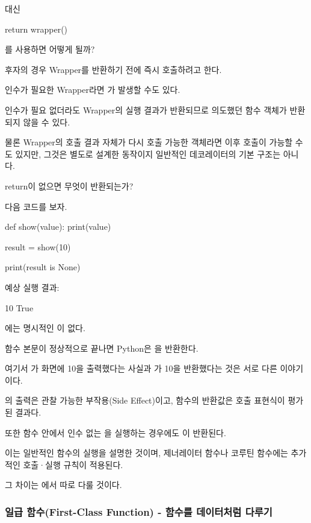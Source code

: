 대신

\begin{dhkcode}
return wrapper()
\end{dhkcode}

를 사용하면 어떻게 될까?

후자의 경우 Wrapper를 반환하기 전에 즉시 호출하려고 한다.

인수가 필요한 Wrapper라면 가 발생할 수도 있다.

인수가 필요 없더라도 Wrapper의 실행 결과가 반환되므로 의도했던 함수 객체가 반환되지 않을 수 있다.

물론 Wrapper의 호출 결과 자체가 다시 호출 가능한 객체라면 이후 호출이 가능할 수도 있지만, 그것은 별도로 설계한 동작이지 일반적인 데코레이터의 기본 구조는 아니다.

\begin{dhknote}
\begin{dhksmry}[centered]
return이 없으면 무엇이 반환되는가?
\end{dhksmry}
\end{dhknote}

다음 코드를 보자.

\begin{dhkcode}
def show(value):
    print(value)

result = show(10)

print(result is None)
\end{dhkcode}

예상 실행 결과:

\begin{dhkzsh}
10
True
\end{dhkzsh}

에는 명시적인 이 없다.

함수 본문이 정상적으로 끝나면 Python은 을 반환한다.

여기서 가 화면에 10을 출력했다는 사실과 가 10을 반환했다는 것은 서로 다른 이야기이다.

의 출력은 관찰 가능한 부작용(Side Effect)이고, 함수의 반환값은 호출 표현식이 평가된 결과다.

또한 함수 안에서 인수 없는 을 실행하는 경우에도 이 반환된다.

이는 일반적인  함수의 실행을 설명한 것이며, 제너레이터 함수나 코루틴 함수에는 추가적인 호출·실행 규칙이 적용된다.

그 차이는 에서 따로 다룰 것이다.

\subsubsection{일급 함수(First-Class Function) - 함수를 데이터처럼 다루기}

